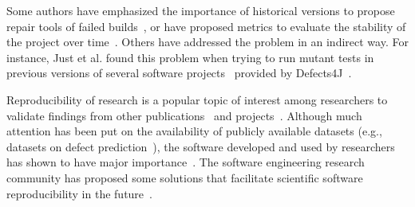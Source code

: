 Some authors have emphasized the importance of historical versions to propose repair tools of failed builds~\cite{HireBuild}, or have proposed metrics to evaluate the stability of the project over time~\cite{6405296}.
Others have addressed the problem in an indirect way.
For instance, Just et al. found this problem when trying to run mutant tests in previous versions of several software projects~\cite{Just:2014:MVS:2635868.2635929} provided by Defects4J~\cite{Just:2014:DDE:2610384.2628055}.

Reproducibility of research is a popular topic of interest among researchers to validate findings from other publications~\cite{RODRIGUEZPEREZ2018164} and projects~\cite{4693714}.
Although much attention has been put on the availability of publicly available datasets (e.g., datasets on defect prediction~\cite{wahono2015systematic}), the software developed and used by researchers has shown to have major importance~\cite{rodriguez2012software, bruntink2014initial}.
The software engineering research community has proposed some solutions that facilitate scientific software reproducibility in the future~\cite{DBLP:journals/corr/Weber17,DockerReproducibility2016,Boettiger:2015:IDR:2723872.2723882}.







